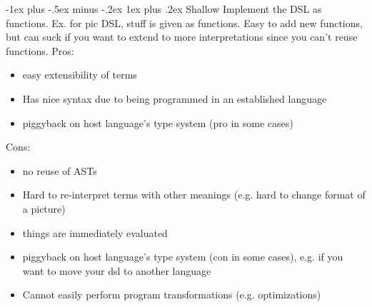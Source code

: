 \documentclass[letterpaper, 8pt]{extarticle}
\makeatletter
\renewcommand{\subsubsection}{\@startsection{subsubsection}{3}{0mm}%
                                {-1ex plus -.5ex minus -.2ex}%
                                {1ex plus .2ex}%
                                {\normalfont\tiny\bfseries}}
\makeatother
\begin{document}
\begin{multicols*}{4}
    \subsubsection{Shallow}
    Implement the DSL as functions.
    Ex. for pic DSL, stuff is given as functions.
    Easy to add new functions,
    but can suck if you want to extend to more interpretations since you can't reuse functions.
    Pros:
    \begin{itemize}
        \item{easy extensibility of terms}
        \item{Has nice syntax due to being programmed in an established language}
        \item{piggyback on host language's type system (pro in some cases)}
    \end{itemize}
    Cons:
    \begin{itemize}
        \item{no reuse of ASTs}
        \item{Hard to re-interpret terms with other meanings (e.g. hard to change format of a picture)}
        \item{things are immediately evaluated}
        \item{piggyback on host language's type system (con in some cases), e.g. if you want
              to move your dsl to another language}
        \item{Cannot easily perform program transformations (e.g. optimizations)}
    \end{itemize}

\end{multicols*}
\end{document}
